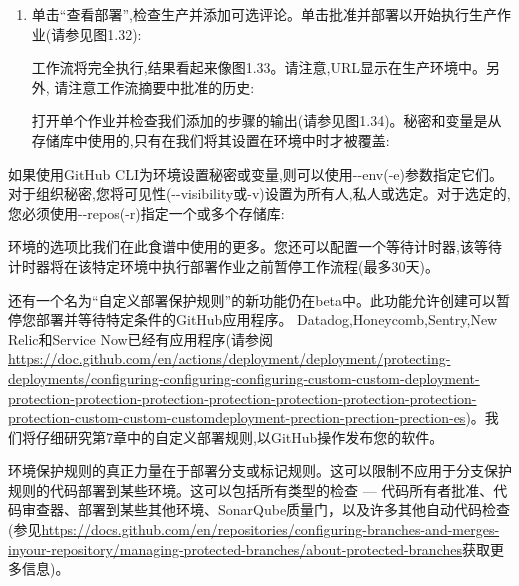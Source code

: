 \begin{enumerate}
\item 
单击“查看部署”,检查生产并添加可选评论。单击批准并部署以开始执行生产作业(请参见图1.32):


工作流将完全执行,结果看起来像图1.33。请注意,URL显示在生产环境中。另外, 请注意工作流摘要中批准的历史:


打开单个作业并检查我们添加的步骤的输出(请参见图1.34)。秘密和变量是从存储库中使用的,只有在我们将其设置在环境中时才被覆盖:


\end{enumerate}


如果使用GitHub CLI为环境设置秘密或变量,则可以使用-{}-env(-e)参数指定它们。对于组织秘密,您将可见性(-{}-visibility或-v)设置为所有人,私人或选定。对于选定的,您必须使用-{}-repos(-r)指定一个或多个存储库:


环境的选项比我们在此食谱中使用的更多。您还可以配置一个等待计时器,该等待计时器将在该特定环境中执行部署作业之前暂停工作流程(最多30天)。

还有一个名为“自定义部署保护规则”的新功能仍在beta中。此功能允许创建可以暂停您部署并等待特定条件的GitHub应用程序。 Datadog,Honeycomb,Sentry,New Relic和Service Now已经有应用程序(请参阅\url{https://doc.github.com/en/actions/deployment/deployment/protecting-deployments/configuring-configuring-configuring-custom-custom-deployment-protection-protection-protection-protection-protection-protection-protection-protection-custom-custom-customdeployment-prection-prection-prection-es})。我们将仔细研究第7章中的自定义部署规则,以GitHub操作发布您的软件。

环境保护规则的真正力量在于部署分支或标记规则。这可以限制不应用于分支保护规则的代码部署到某些环境。这可以包括所有类型的检查 --- 代码所有者批准、代码审查器、部署到某些其他环境、SonarQube质量门，以及许多其他自动代码检查(参见\url{https://docs.github.com/en/repositories/configuring-branches-and-merges-inyour-repository/managing-protected-branches/about-protected-branches}获取更多信息)。

























